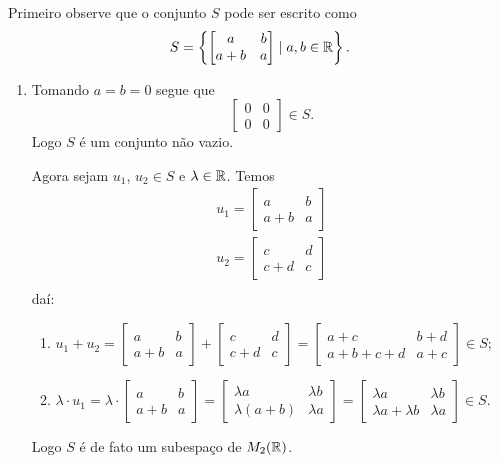 \documentclass[12pt]{exam}
\begin{document}
    \solucao Primeiro observe que o conjunto $S$ pode ser escrito como
    \[
        S = \left\{\begin{bmatrix}
            a & b\\a + b & a
        \end{bmatrix} \mid a, b \in \mathbb{R}\right\}.
    \]
    \begin{enumerate}[label={\alph*})]
        \item Tomando $a = b = 0$ segue que
        \[
            \begin{bmatrix}
                0 & 0\\ 0 & 0
            \end{bmatrix} \in S.
        \]
        Logo $S$ é um conjunto não vazio.

        Agora sejam $u_1$, $u_2 \in S$ e $\lambda \in \mathbb{R}$. Temos
        \begin{align*}
            u_1 = \begin{bmatrix}a & b\\a + b & a\end{bmatrix}\\
            u_2 = \begin{bmatrix}c & d\\c + d & c\end{bmatrix}\\
        \end{align*}
        daí:
        \begin{enumerate}[label={\roman*})]
            \item $u_1 + u_2 = \begin{bmatrix}a & b\\a + b & a\end{bmatrix} + \begin{bmatrix}c & d\\c + d & c\end{bmatrix} = \begin{bmatrix}a + c & b + d\\a + b + c + d & a + c\end{bmatrix}\in S$;
            \item $\lambda\cdot u_1 = \lambda\cdot \begin{bmatrix}a & b\\a + b & a\end{bmatrix} = \begin{bmatrix}\lambda a & \lambda b\\\lambda(a + b) & \lambda a\end{bmatrix} = \begin{bmatrix}\lambda a & \lambda b\\\lambda a + \lambda b & \lambda a\end{bmatrix} \in S$.
        \end{enumerate}
        Logo $S$ é de fato um subespaço de $M_2(\mathbb{R})$.


\end{enumerate}
\end{document}

